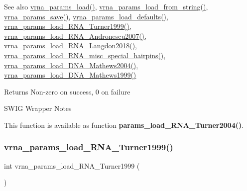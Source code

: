 \begin{DoxySeeAlso}{See also}
\mbox{\hyperlink{group__energy__parameters__rw_gabb0583595c67094986ef90cb4f1c7555}{vrna\+\_\+params\+\_\+load()}}, \mbox{\hyperlink{group__energy__parameters__rw_gabcd9cc7040a6b633b56b1cbd6a14d68e}{vrna\+\_\+params\+\_\+load\+\_\+from\+\_\+string()}}, \mbox{\hyperlink{group__energy__parameters__rw_ga0de3731b3e4017c52bd678549f6c4ae5}{vrna\+\_\+params\+\_\+save()}}, \mbox{\hyperlink{group__energy__parameters__rw_ga413bc688695c9a707dbcc678412d6792}{vrna\+\_\+params\+\_\+load\+\_\+defaults()}}, \mbox{\hyperlink{group__energy__parameters__rw_ga804393b6dfe06a2c6cae89219dffabb1}{vrna\+\_\+params\+\_\+load\+\_\+\+R\+N\+A\+\_\+\+Turner1999()}}, \mbox{\hyperlink{group__energy__parameters__rw_ga511a1c17c0fd10a1fbb0936674712ff8}{vrna\+\_\+params\+\_\+load\+\_\+\+R\+N\+A\+\_\+\+Andronescu2007()}}, \mbox{\hyperlink{group__energy__parameters__rw_ga3a87fe5e73eb906c0fa26f2c42c787fd}{vrna\+\_\+params\+\_\+load\+\_\+\+R\+N\+A\+\_\+\+Langdon2018()}}, \mbox{\hyperlink{group__energy__parameters__rw_ga00e07504d66dc24aca7befb4bdaa0db1}{vrna\+\_\+params\+\_\+load\+\_\+\+R\+N\+A\+\_\+misc\+\_\+special\+\_\+hairpins()}}, \mbox{\hyperlink{group__energy__parameters__rw_gafa45b5734355baa634ca0a2e2857563e}{vrna\+\_\+params\+\_\+load\+\_\+\+D\+N\+A\+\_\+\+Mathews2004()}}, \mbox{\hyperlink{group__energy__parameters__rw_ga4d897130a700f86b7d4035a95f25615a}{vrna\+\_\+params\+\_\+load\+\_\+\+D\+N\+A\+\_\+\+Mathews1999()}}
\end{DoxySeeAlso}
\begin{DoxyReturn}{Returns}
Non-\/zero on success, 0 on failure
\end{DoxyReturn}
\begin{DoxyRefDesc}{S\+W\+I\+G Wrapper Notes}
\item[\mbox{\hyperlink{wrappers__wrappers000102}{S\+W\+I\+G Wrapper Notes}}]This function is available as function {\bfseries{params\+\_\+load\+\_\+\+R\+N\+A\+\_\+\+Turner2004()}}. \end{DoxyRefDesc}
\mbox{\label{group__energy__parameters__rw_ga804393b6dfe06a2c6cae89219dffabb1}} 
\subsubsection{\texorpdfstring{vrna\_params\_load\_RNA\_Turner1999()}{vrna\_params\_load\_RNA\_Turner1999()}}
{\footnotesize\ttfamily int vrna\+\_\+params\+\_\+load\+\_\+\+R\+N\+A\+\_\+\+Turner1999 (\begin{DoxyParamCaption}\item[{void}]{ }\end{DoxyParamCaption})}



